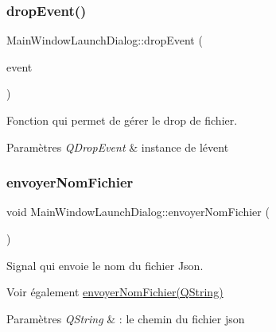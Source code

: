 \subsubsection{\texorpdfstring{drop\+Event()}{dropEvent()}}
{\footnotesize\ttfamily Main\+Window\+Launch\+Dialog\+::drop\+Event (\begin{DoxyParamCaption}\item[{Q\+Drop\+Event $\ast$}]{event }\end{DoxyParamCaption})\hspace{0.3cm}{\ttfamily [private]}}



Fonction qui permet de gérer le drop de fichier. 


\begin{DoxyParams}{Paramètres}
{\em Q\+Drop\+Event} & instance de l\textquotesingle{}évent \\
\hline
\end{DoxyParams}
\mbox{\label{classMainWindowLaunchDialog_ab439c55ab98e6b1634de4fe64243ce48}} 
\subsubsection{\texorpdfstring{envoyer\+Nom\+Fichier}{envoyerNomFichier}}
{\footnotesize\ttfamily void Main\+Window\+Launch\+Dialog\+::envoyer\+Nom\+Fichier (\begin{DoxyParamCaption}\item[{Q\+String}]{ }\end{DoxyParamCaption})\hspace{0.3cm}{\ttfamily [signal]}}



Signal qui envoie le nom du fichier Json. 

\begin{DoxySeeAlso}{Voir également}
\hyperlink{classMainWindowLaunchDialog_ab439c55ab98e6b1634de4fe64243ce48}{envoyer\+Nom\+Fichier(\+Q\+String)} 
\end{DoxySeeAlso}

\begin{DoxyParams}{Paramètres}
{\em Q\+String} & \+: le chemin du fichier json \\
\hline
\end{DoxyParams}
\mbox{\label{classMainWindowLaunchDialog_a91bfa59302a3591b7b3b11b03d6f9b0e}} 
